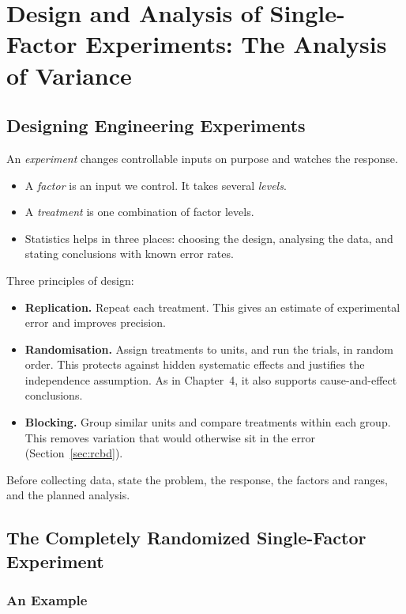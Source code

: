 \chapter{Design and Analysis of Single-Factor Experiments: The Analysis of Variance}

\section{Designing Engineering Experiments}

An \emph{experiment} changes controllable inputs on purpose and watches the response.
\begin{itemize}
  \item A \emph{factor} is an input we control. It takes several \emph{levels}.
  \item A \emph{treatment} is one combination of factor levels.
  \item Statistics helps in three places: choosing the design, analysing the data, and stating conclusions with known error rates.
\end{itemize}

Three principles of design:
\begin{itemize}
  \item \textbf{Replication.} Repeat each treatment. This gives an estimate of experimental error and improves precision.
  \item \textbf{Randomisation.} Assign treatments to units, and run the trials, in random order. This protects against hidden systematic effects and justifies the independence assumption. As in Chapter~4, it also supports cause-and-effect conclusions.
  \item \textbf{Blocking.} Group similar units and compare treatments within each group. This removes variation that would otherwise sit in the error (Section~\ref{sec:rcbd}).
\end{itemize}
Before collecting data, state the problem, the response, the factors and ranges, and the planned analysis.

\section{The Completely Randomized Single-Factor Experiment}

\subsection{An Example}

